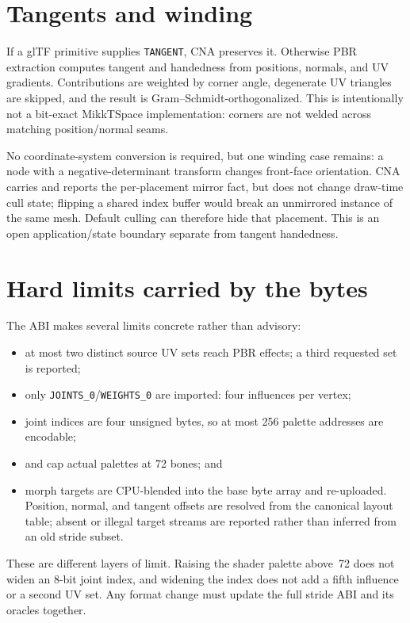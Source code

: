 \section{Tangents and winding}

If a glTF primitive supplies \texttt{TANGENT}, CNA preserves it. Otherwise PBR extraction
computes tangent and handedness from positions, normals, and UV gradients. Contributions are
weighted by corner angle, degenerate UV triangles are skipped, and the result is
Gram--Schmidt-orthogonalized. This is intentionally not a bit-exact MikkTSpace implementation:
corners are not welded across matching position/normal seams.

No coordinate-system conversion is required, but one winding case remains: a node with a
negative-determinant transform changes front-face orientation. CNA carries and reports the
per-placement mirror fact, but does not change draw-time cull state; flipping a shared index
buffer would break an unmirrored instance of the same mesh. Default culling can therefore hide
that placement. This is an open application/state boundary separate from tangent handedness.

\section{Hard limits carried by the bytes}

The ABI makes several limits concrete rather than advisory:

\begin{itemize}
  \item at most two distinct source UV sets reach PBR effects; a third requested set is reported;
  \item only \texttt{JOINTS\_0}/\texttt{WEIGHTS\_0} are imported: four influences per vertex;
  \item joint indices are four unsigned bytes, so at most 256 palette addresses are encodable;
  \item {} and  cap actual palettes at 72
        bones; and
  \item morph targets are CPU-blended into the base byte array and re-uploaded. Position, normal,
        and tangent offsets are resolved from the canonical layout table; absent or illegal target
        streams are reported rather than inferred from an old stride subset.
\end{itemize}

These are different layers of limit. Raising the shader palette above~72 does not widen an
8-bit joint index, and widening the index does not add a fifth influence or a second UV set.
Any format change must update the full stride ABI and its oracles together.
